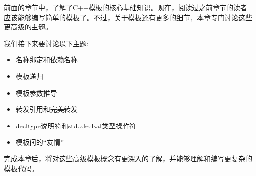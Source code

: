 前面的章节中，了解了C++模板的核心基础知识。现在，阅读过之前章节的读者应该能够编写简单的模板了。不过，关于模板还有更多的细节，本章专门讨论这些更高级的主题。

我们接下来要讨论以下主题:

\begin{itemize}
\item
名称绑定和依赖名称

\item
模板递归

\item
模板参数推导

\item
转发引用和完美转发

\item
decltype说明符和std::declval类型操作符

\item
模板间的“友情”
\end{itemize}

完成本章后，将对这些高级模板概念有更深入的了解，并能够理解和编写更复杂的模板代码。




















